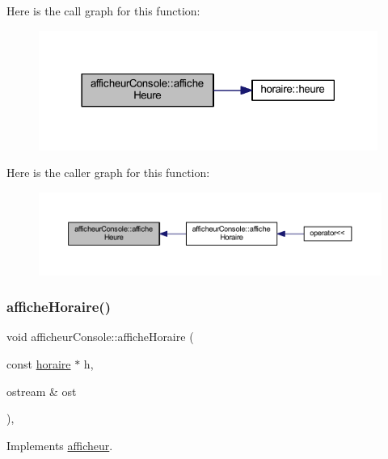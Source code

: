 Here is the call graph for this function\+:\nopagebreak
\begin{figure}[H]
\begin{center}
\leavevmode
\includegraphics[width=314pt]{classafficheur_console_a842884a9553df737f781d2f8f040d30e_cgraph}
\end{center}
\end{figure}
Here is the caller graph for this function\+:\nopagebreak
\begin{figure}[H]
\begin{center}
\leavevmode
\includegraphics[width=350pt]{classafficheur_console_a842884a9553df737f781d2f8f040d30e_icgraph}
\end{center}
\end{figure}
\hypertarget{classafficheur_console_a44e40b275c8b0b1a33cdc5bd46a31cf3}{}\label{classafficheur_console_a44e40b275c8b0b1a33cdc5bd46a31cf3} 
\subsubsection{\texorpdfstring{affiche\+Horaire()}{afficheHoraire()}}
{\footnotesize\ttfamily void afficheur\+Console\+::affiche\+Horaire (\begin{DoxyParamCaption}\item[{const \hyperlink{classhoraire}{horaire} $\ast$}]{h,  }\item[{ostream \&}]{ost }\end{DoxyParamCaption})\hspace{0.3cm}{\ttfamily [override]}, {\ttfamily [virtual]}}



Implements \hyperlink{classafficheur_aa598626f11775b4c610b8f262017cad7}{afficheur}.



